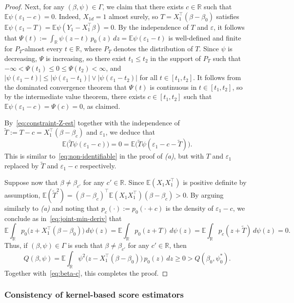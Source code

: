 \documentclass[a4paper]{article}
\newcommand{\R}{\mathbb{R}}
\newcommand{\E}{\mathbb{E}}
\theoremstyle{definition}
\begin{document}
\begin{proof}
Next, for any $(\beta,\psi) \in \Gamma$, we claim that there exists $c \in \R$ such that $\E\psi(\varepsilon_1 - c) = 0$. Indeed, $X_{1d} = 1$ almost surely, so $T = X_1^\top (\beta - \beta_0)$ satisfies $\E\psi(\varepsilon_1 - T) = \E\psi(Y_1 - X_1^\top\beta) = 0$. By the independence of $T$ and $\varepsilon$, it follows that $\varPsi(t) := \int_\R \psi(z - t)\,p_0(z)\,dz = \E\psi(\varepsilon_1 - t)$ is well-defined and finite for $P_T$-almost every $t \in \R$, where $P_T$ denotes the distribution of $T$. Since $\psi$ is decreasing, $\varPsi$ is increasing, so there exist $t_1 \leq t_2$ in the support of $P_T$ such that $-\infty < \varPsi(t_1) \leq 0 \leq \varPsi(t_2) < \infty$, and $|\psi(\varepsilon_1 - t)| \leq |\psi(\varepsilon_1 - t_1)| \vee |\psi(\varepsilon_1 - t_2)|$ for all $t \in [t_1,t_2]$. It follows from the dominated convergence theorem that $\varPsi(t)$ is continuous in $t \in [t_1,t_2]$, so by the intermediate value theorem, there exists $c \in [t_1,t_2]$ such that $\E\psi(\varepsilon_1 - c) = \varPsi(c) = 0$, as claimed.

By~\eqref{eq:constraint-Z-est} together with the independence of $\tilde{T} := T - c = X_1^\top (\beta - \beta_c)$ and $\varepsilon_1$, we deduce that  
\[
\E\bigl(\tilde{T}\psi(\varepsilon_1 - c)\bigr) = 0 = \E\bigl(\tilde{T}\psi(\varepsilon_1 - c - \tilde{T})\bigr).
\]
This is similar to~\eqref{eq:non-identifiable} in the proof of \emph{(a)}, but with $T$ and $\varepsilon_1$ replaced by $\tilde{T}$ and $\varepsilon_1 - c$ respectively. 

Suppose now that $\beta \neq \beta_{c'}$ for any $c' \in \R$. Since $\E(X_1 X_1^\top)$ is positive definite by assumption, $\E(\tilde{T}^2) = (\beta - \beta_c)^\top \E(X_1 X_1^\top) (\beta - \beta_c) > 0$. By arguing similarly to \emph{(a)} and noting that $p_c(\cdot) := p_0(\cdot + c)$ is the density of $\varepsilon_1 - c$, we conclude as in~\eqref{eq:joint-min-deriv} that
\[
\E\int_\R p_0\bigl(z + X_1^\top(\beta - \beta_0)\bigr)\,d\psi(z) = \E\int_\R p_0(z + T)\,d\psi(z) = \E\int_\R p_c(z + \tilde{T})\,d\psi(z) = 0.
\]
Thus, if $(\beta,\psi) \in \Gamma$ is such that $\beta \neq \beta_{c'}$ for any $c' \in \R$, then
\[
Q(\beta,\psi) = \E\int_\R \psi^2\bigl(z - X_1^\top(\beta - \beta_0)\bigr)\,p_0(z)\,dz \geq 0 > Q(\beta_0,\psi_0^*).
\]
Together with~\eqref{eq:beta-c}, this completes the proof.
\end{proof}

\subsubsection{Consistency of kernel-based score estimators}
\label{subsubsec:score-estimation}
\end{document}
